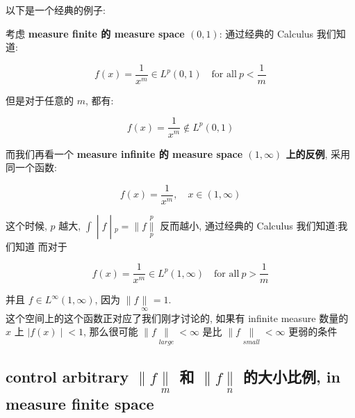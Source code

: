 \documentclass{qlnotes-export}
\begin{document}
以下是一个经典的例子:

\begin{example}\label{ex-09-l-p-space-and-inequalities-example-004}

考虑 \textbf{measure finite 的 measure space \((0,1)\)}: 通过经典的 Calculus 我们知道:

\[f(x) = \frac{1}{x^{m}} \in L^{p}(0,1)\quad\text{for all}\ p < \frac{1}{m}\]

但是对于任意的 \(m\), 都有:

\[f(x) = \frac{1}{x^{m}} \notin L^{p}(0,1)\]

而我们再看一个 \textbf{measure infinite 的 measure space \((1,\infty)\) 上的反例}, 采用同一个函数:

\[f(x) = \frac{1}{x^{m}},\quad x \in (1,\infty)\]

这个时候, \(p\) 越大, \(\left. \int \middle| f \middle| {}_{p} = \parallel f\underset{p}{\overset{p}{\parallel}} \right.\) 反而越小, 通过经典的 Calculus 我们知道:我们知道 而对于

\[f(x) = \frac{1}{x^{m}} \in L^{p}(1,\infty)\quad\text{for all}\ p > \frac{1}{m}\]

并且 \(f \in L^{\infty}(1,\infty)\), 因为 \(\parallel f\underset{\infty}{\parallel} = 1\).\\
这个空间上的这个函数正对应了我们刚才讨论的, 如果有 infinite measure 数量的 \(x\) 上 \(\left. |f(x) \middle| < 1 \right.\), 那么很可能 \(\parallel f\underset{large}{\parallel} < \infty\) 是比 \(\parallel f\underset{small}{\parallel} < \infty\) 更弱的条件

\end{example}

\subsection{\texorpdfstring{control arbitrary \(\parallel f\underset{m}{\parallel}\) 和 \(\parallel f\underset{n}{\parallel}\) 的大小比例, in measure finite space}{control arbitrary \textbackslash parallel f\textbackslash underset\{m\}\{\textbackslash parallel\} 和 \textbackslash parallel f\textbackslash underset\{n\}\{\textbackslash parallel\} 的大小比例, in measure finite space}}\label{control-arbitrary-parallel-fundersetmparallel-ux548c-parallel-fundersetnparallel-ux7684ux5927ux5c0fux6bd4ux4f8b-in-measure-finite-space}
\end{document}
